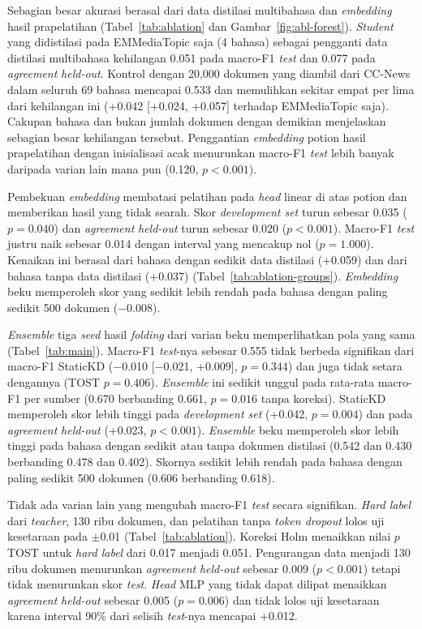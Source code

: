 \documentclass{ieeeaccess}
\newcommand{\en}[1]{\textit{#1}}
\begin{document}
Sebagian besar akurasi berasal dari data distilasi multibahasa dan \en{embedding} hasil prapelatihan (Tabel~\ref{tab:ablation} dan Gambar~\ref{fig:abl-forest}). \en{Student} yang didistilasi pada EMMediaTopic saja (4 bahasa) sebagai pengganti data distilasi multibahasa kehilangan 0.051 pada macro-F1 \en{test} dan 0.077 pada \en{agreement} \en{held-out}. Kontrol dengan 20,000 dokumen yang diambil dari CC-News dalam seluruh 69 bahasa mencapai 0.533 dan memulihkan sekitar empat per lima dari kehilangan ini (+0.042 [+0.024, +0.057] terhadap EMMediaTopic saja). Cakupan bahasa dan bukan jumlah dokumen dengan demikian menjelaskan sebagian besar kehilangan tersebut. Penggantian \en{embedding} potion hasil prapelatihan dengan inisialisasi acak menurunkan macro-F1 \en{test} lebih banyak daripada varian lain mana pun (0.120, $p<0.001$).

Pembekuan \en{embedding} membatasi pelatihan pada \en{head} linear di atas potion dan memberikan hasil yang tidak searah. Skor \en{development set} turun sebesar 0.035 ($p=0.040$) dan \en{agreement} \en{held-out} turun sebesar 0.020 ($p<0.001$). Macro-F1 \en{test} justru naik sebesar 0.014 dengan interval yang mencakup nol ($p=1.000$). Kenaikan ini berasal dari bahasa dengan sedikit data distilasi (+0.059) dan dari bahasa tanpa data distilasi (+0.037) (Tabel~\ref{tab:ablation-groups}). \en{Embedding} beku memperoleh skor yang sedikit lebih rendah pada bahasa dengan paling sedikit 500 dokumen ($-$0.008).

\en{Ensemble} tiga \en{seed} hasil \en{folding} dari varian beku memperlihatkan pola yang sama (Tabel~\ref{tab:main}). Macro-F1 \en{test}-nya sebesar 0.555 tidak berbeda signifikan dari macro-F1 StaticKD ($-$0.010 [$-$0.021, +0.009], $p=0.344$) dan juga tidak setara dengannya (TOST $p=0.406$). \en{Ensemble} ini sedikit unggul pada rata-rata macro-F1 per sumber (0.670 berbanding 0.661, $p=0.016$ tanpa koreksi). StaticKD memperoleh skor lebih tinggi pada \en{development set} (+0.042, $p=0.004$) dan pada \en{agreement} \en{held-out} (+0.023, $p<0.001$). \en{Ensemble} beku memperoleh skor lebih tinggi pada bahasa dengan sedikit atau tanpa dokumen distilasi (0.542 dan 0.430 berbanding 0.478 dan 0.402). Skornya sedikit lebih rendah pada bahasa dengan paling sedikit 500 dokumen (0.606 berbanding 0.618).

Tidak ada varian lain yang mengubah macro-F1 \en{test} secara signifikan. \en{Hard label} dari \en{teacher}, 130 ribu dokumen, dan pelatihan tanpa \en{token dropout} lolos uji kesetaraan pada $\pm$0.01 (Tabel~\ref{tab:ablation}). Koreksi Holm menaikkan nilai $p$ TOST untuk \en{hard label} dari 0.017 menjadi 0.051. Pengurangan data menjadi 130 ribu dokumen menurunkan \en{agreement} \en{held-out} sebesar 0.009 ($p<0.001$) tetapi tidak menurunkan skor \en{test}. \en{Head} MLP yang tidak dapat dilipat menaikkan \en{agreement} \en{held-out} sebesar 0.005 ($p=0.006$) dan tidak lolos uji kesetaraan karena interval 90\% dari selisih \en{test}-nya mencapai +0.012.
\end{document}
